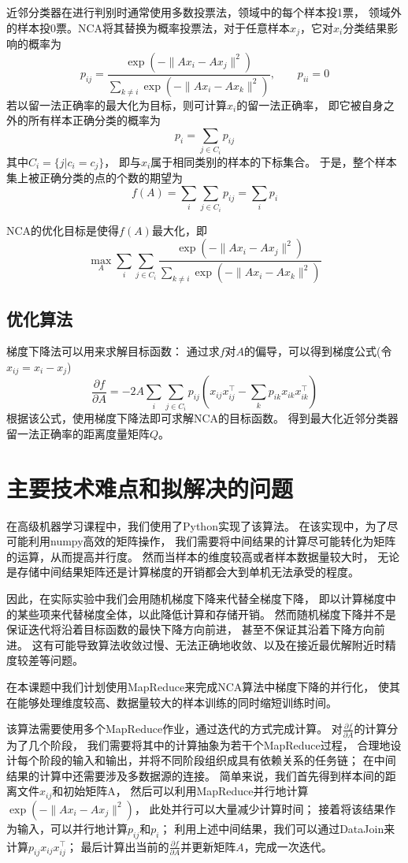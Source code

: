 \documentclass[a4paper,UTF8]{article}
\theoremstyle{definition}
\begin{document}
近邻分类器在进行判别时通常使用多数投票法，领域中的每个样本投1票，
领域外的样本投0票。NCA将其替换为概率投票法，对于任意样本$x_{j}$，它对$x_{i}$分类结果影响的概率为
\[
	p_{ij} = \frac{\exp(-\lVert Ax_{i} - Ax_{j} \rVert^2)}
	{\sum_{k \neq i} \exp(-\lVert Ax_{i} - Ax_{k} \rVert^2)}, \qquad
	p_{ii} = 0
\]
若以留一法正确率的最大化为目标，则可计算$x_{i}$的留一法正确率，
即它被自身之外的所有样本正确分类的概率为
\[
	p_{i} = \sum_{j \in C_{i}} p_{ij}
\]
其中$C_{i} = \lbrace j \vert c_{i} = c_{j} \rbrace$，
即与$x_{i}$属于相同类别的样本的下标集合。
于是，整个样本集上被正确分类的点的个数的期望为
\[
	f(A) = \sum_{i} \sum_{j \in C_{i}} p_{ij} = \sum_{i} p_{i}
\]

NCA的优化目标是使得$f(A)$最大化，即
\[
	\max_{A} \sum_{i} \sum_{j \in C_{i}}
	\frac{\exp(-\lVert Ax_{i} - Ax_{j} \rVert^2)}
	{\sum_{k \neq i} \exp(-\lVert Ax_{i} - Ax_{k} \rVert^2)}
\]

\subsection*{优化算法}

梯度下降法可以用来求解目标函数：
通过求$f$对$A$的偏导，可以得到梯度公式(令$x_{ij} = x_{i} - x_{j}$)
\[
	\frac{\partial f}{\partial A} =
	-2A \sum_{i} \sum_{j \in C_{i}}
	p_{ij}( x_{ij} x_{ij}^\top - \sum_{k} p_{ik} x_{ik} x_{ik}^\top)
\]
根据该公式，使用梯度下降法即可求解NCA的目标函数。
得到最大化近邻分类器留一法正确率的距离度量矩阵$Q$。

\section*{主要技术难点和拟解决的问题}

在高级机器学习课程中，我们使用了Python实现了该算法。
在该实现中，为了尽可能利用numpy高效的矩阵操作，
我们需要将中间结果的计算尽可能转化为矩阵的运算，从而提高并行度。
然而当样本的维度较高或者样本数据量较大时，
无论是存储中间结果矩阵还是计算梯度的开销都会大到单机无法承受的程度。

因此，在实际实验中我们会用随机梯度下降来代替全梯度下降，
即以计算梯度中的某些项来代替梯度全体，以此降低计算和存储开销。
然而随机梯度下降并不是保证迭代将沿着目标函数的最快下降方向前进，
甚至不保证其沿着下降方向前进。
这有可能导致算法收敛过慢、无法正确地收敛、以及在接近最优解附近时精度较差等问题。

在本课题中我们计划使用MapReduce来完成NCA算法中梯度下降的并行化，
使其在能够处理维度较高、数据量较大的样本训练的同时缩短训练时间。

该算法需要使用多个MapReduce作业，通过迭代的方式完成计算。
对$\frac{\partial f}{\partial A}$的计算分为了几个阶段，
我们需要将其中的计算抽象为若干个MapReduce过程，
合理地设计每个阶段的输入和输出，并将不同阶段组织成具有依赖关系的任务链；
在中间结果的计算中还需要涉及多数据源的连接。
简单来说，我们首先得到样本间的距离文件$x_{ij}$和初始矩阵A，
然后可以利用MapReduce并行地计算$\exp(-\lVert Ax_{i} - Ax_{j} \rVert^2)$，
此处并行可以大量减少计算时间；
接着将该结果作为输入，可以并行地计算$p_{ij}$和$p_{i}$；
利用上述中间结果，我们可以通过DataJoin来计算$p_{ij} x_{ij} x_{ij}^\top$；
最后计算出当前的$\frac{\partial f}{\partial A}$并更新矩阵$A$，完成一次迭代。
\end{document}
